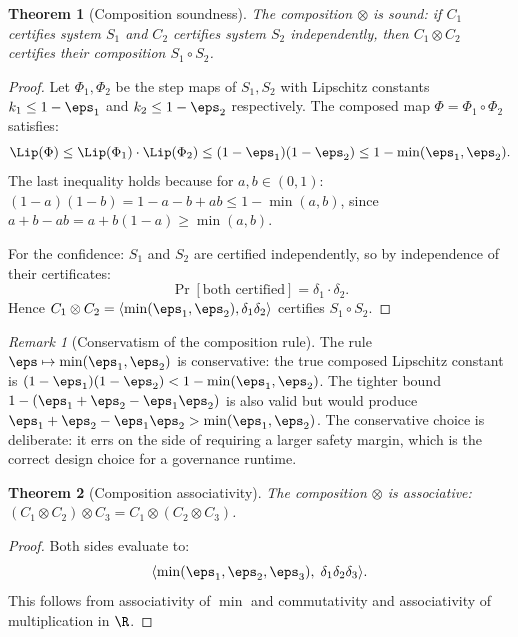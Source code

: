 \documentclass[11pt,letterpaper]{article}
\theoremstyle{pirtmthm}
\newtheorem{theorem}{Theorem}[section]
\theoremstyle{remark}
\newtheorem{remark}{Remark}[section]
\begin{document}
\begin{theorem}[Composition soundness]
\label{thm:A-compose-sound}
The composition $\otimes$ is sound: if $C_1$ certifies system $S_1$
and $C_2$ certifies system $S_2$ independently, then $C_1 \otimes C_2$
certifies their composition $S_1 \circ S_2$.
\end{theorem}

\begin{proof}
Let $\Phi_1, \Phi_2$ be the step maps of $S_1, S_2$ with Lipschitz
constants $k_1 \leq 1 - \eps_1$ and $k_2 \leq 1 - \eps_2$ respectively.
The composed map $\Phi = \Phi_1 \circ \Phi_2$ satisfies:
\[
  \Lip(\Phi) \leq \Lip(\Phi_1) \cdot \Lip(\Phi_2)
  \leq (1-\eps_1)(1-\eps_2) \leq 1 - \min(\eps_1,\eps_2).
\]
The last inequality holds because for $a,b \in (0,1)$:
$(1-a)(1-b) = 1 - a - b + ab \leq 1 - \min(a,b)$,
since $a + b - ab = a + b(1-a) \geq \min(a,b)$.

For the confidence: $S_1$ and $S_2$ are certified independently,
so by independence of their certificates:
\[
  \Pr[\text{both certified}] = \delta_1 \cdot \delta_2.
\]
Hence $C_1 \otimes C_2 = \langle\min(\eps_1,\eps_2), \delta_1\delta_2\rangle$
certifies $S_1 \circ S_2$.
\end{proof}

\begin{remark}[Conservatism of the composition rule]
The rule $\eps \mapsto \min(\eps_1,\eps_2)$ is conservative: the true
composed Lipschitz constant is $(1-\eps_1)(1-\eps_2) < 1 - \min(\eps_1,\eps_2)$.
The tighter bound $1 - (\eps_1 + \eps_2 - \eps_1\eps_2)$ is also valid
but would produce $\eps_1 + \eps_2 - \eps_1\eps_2 > \min(\eps_1,\eps_2)$.
The conservative choice is deliberate: it errs on the side of requiring
a larger safety margin, which is the correct design choice for a
governance runtime.
\end{remark}

\begin{theorem}[Composition associativity]
\label{thm:A-compose-assoc}
The composition $\otimes$ is associative:
$(C_1 \otimes C_2) \otimes C_3 = C_1 \otimes (C_2 \otimes C_3)$.
\end{theorem}

\begin{proof}
Both sides evaluate to:
\[
  \langle\min(\eps_1,\eps_2,\eps_3),\; \delta_1\delta_2\delta_3\rangle.
\]
This follows from associativity of $\min$ and commutativity and
associativity of multiplication in $\R$.
\end{proof}
\end{document}

